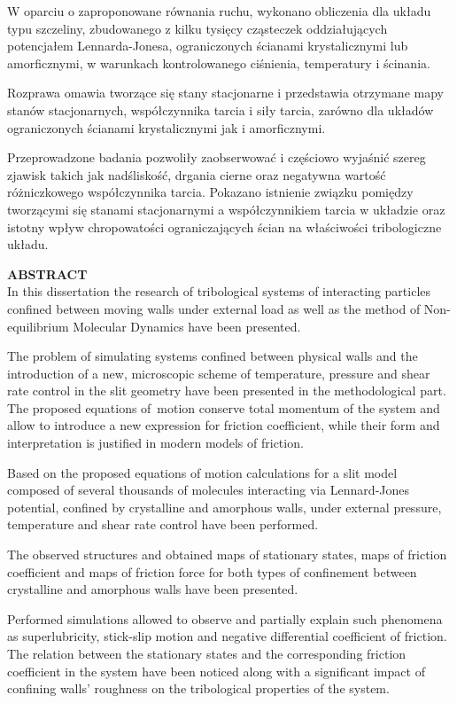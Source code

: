 \documentclass[12pt,a4paper,openright]{report} %
\begin{document}
W oparciu o zaproponowane równania ruchu, wykonano obliczenia dla układu typu szczeliny, zbudowanego z kilku tysięcy cząsteczek oddziałujących potencjałem Lennarda-Jonesa, ograniczonych ścianami krystalicznymi lub amorficznymi, w warunkach kontrolowanego ciśnienia, temperatury i ścinania.

Rozprawa omawia tworzące się stany stacjonarne i przedstawia otrzymane mapy stanów stacjonarnych, współczynnika tarcia i siły tarcia, zarówno dla układów ograniczonych ścianami krystalicznymi jak i amorficznymi.

Przeprowadzone badania pozwoliły zaobserwować i częściowo wyjaśnić szereg zjawisk takich jak nadśliskość, drgania cierne oraz negatywna wartość różniczkowego współczynnika tarcia. Pokazano istnienie związku pomiędzy tworzącymi się stanami stacjonarnymi a współczynnikiem tarcia w układzie oraz istotny wpływ chropowatości ograniczających ścian na właściwości tribologiczne układu.

\clearpage\thispagestyle{empty}
\noindent
\textbf{ABSTRACT}
\\ 

In this dissertation the research of tribological systems of interacting particles confined between moving walls under external load as well as the method of Non-equilibrium Molecular Dynamics have been presented. 

The problem of simulating systems confined between physical walls and the introduction of a new, microscopic scheme of temperature, pressure and shear rate control in the slit geometry have been presented in the methodological part. The proposed equations of~motion conserve total momentum of the system and allow to introduce a new expression for friction coefficient, while their form and interpretation is justified in modern models of friction. 

Based on the proposed equations of motion calculations for a slit model composed of several thousands of molecules interacting via Lennard-Jones potential, confined by crystalline and amorphous walls, under external pressure, temperature and shear rate control have been performed. 

The observed structures and obtained maps of stationary states, maps of friction coefficient and maps of friction force for both types of confinement between crystalline and amorphous walls have been presented. 

Performed simulations allowed to observe and partially explain such phenomena as superlubricity, stick-slip motion and negative differential coefficient of friction. The relation between the stationary states and the corresponding friction coefficient in the system have been noticed along with a significant impact of confining walls’ roughness on the tribological properties of the system.
\end{document}
